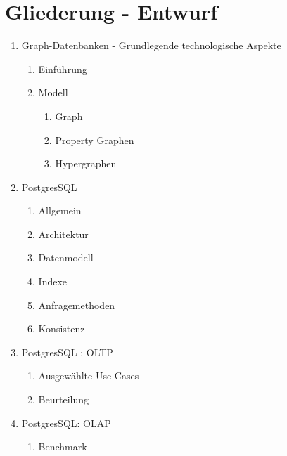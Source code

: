 \chapter*{Gliederung - Entwurf}
    \begin{enumerate}
        \item Graph-Datenbanken - Grundlegende technologische Aspekte
        \begin{enumerate}[label*=\arabic*.]
            \item Einführung
            \item Modell
             \begin{enumerate}[label*=\arabic*.]
            	\item Graph
            	\item Property Graphen
            	\item Hypergraphen
            \end{enumerate}
        \end{enumerate}
        \item PostgresSQL
        \begin{enumerate}[label*=\arabic*.]
            \item Allgemein
            \item Architektur
            \item Datenmodell
            \item Indexe
            \item Anfragemethoden
            \item Konsistenz
        \end{enumerate}
        \item PostgresSQL : OLTP
            \begin{enumerate}[label*=\arabic*.]
                \item Ausgewählte Use Cases
                \item Beurteilung
            \end{enumerate}
        \item PostgresSQL: OLAP
        \begin{enumerate}[label*=\arabic*.]
            \item Benchmark
            \begin{enumerate}[label*=\arabic*.]

\end{enumerate}
\end{enumerate}
\end{enumerate}
